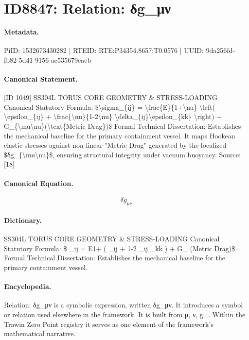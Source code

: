 \section*{ID8847: Relation: δg\_μν}
\paragraph{Metadata.}
PiID: 1532673430282 | RTEID: RTE:P34354.8657:T0.0576 | UUID: 9da256fd-fb82-5d41-9156-ac535679eaeb

\paragraph{Canonical Statement.}
[ID 1049] SS304L TORUS CORE GEOMETRY \& STRESS-LOADING Canonical Statutory Formula: \$\textbackslash{}sigma\_\{ij\} = \textbackslash{}frac\{E\}\{1+\textbackslash{}nu\} \textbackslash{}left( \textbackslash{}epsilon\_\{ij\} + \textbackslash{}frac\{\textbackslash{}nu\}\{1-2\textbackslash{}nu\} \textbackslash{}delta\_\{ij\}\textbackslash{}epsilon\_\{kk\} \textbackslash{}right) + G\_\{\textbackslash{}mu\textbackslash{}nu\}(\textbackslash{}text\{Metric Drag\})\$ Formal Technical Dissertation: Establishes the mechanical baseline for the primary containment vessel. It maps Hookean elastic stresses against non-linear "Metric Drag" generated by the localized \$δg\_\{\textbackslash{}mu\textbackslash{}nu\}\$, ensuring structural integrity under vacuum buoyancy. Source: [18]

\paragraph{Canonical Equation.}
\[
δg_{\mu\nu}
\]

\paragraph{Dictionary.}
SS304L TORUS CORE GEOMETRY \& STRESS-LOADING Canonical Statutory Formula: \$ \_ij = E1+ ( \_ij + 1-2 \_ij \_kk ) + G\_ (Metric Drag)\$ Formal Technical Dissertation: Establishes the mechanical baseline for the primary containment vessel.

\paragraph{Encyclopedia.}
Relation: δg\_μν is a symbolic expression, written δg\_μν. It introduces a symbol or relation used elsewhere in the framework. It is built from μ, ν, g\_. Within the Trawin Zero Point registry it serves as one element of the framework's mathematical narrative.
